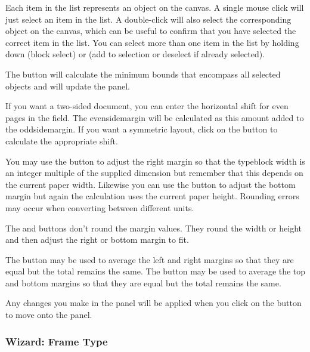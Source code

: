 Each item in the  list represents an \gls{object} on the
\gls{canvas}. A single mouse click will just select an item in the
list. A double-click will also select the corresponding \gls{object}
on the \gls{canvas}, which can be useful to confirm that you have
selected the correct item in the list. You can select more than one
item in the list by holding down  (block select)
or  (add to selection or deselect if already
selected).

The  button will calculate
the minimum bounds that encompass all selected \glspl{object} and
will update the  panel.

If you want a two-sided document, you can enter the horizontal shift
for even pages in the  field.
The \gls{evensidemargin} will be calculated as this
amount added to the \gls{oddsidemargin}.
If you want a symmetric layout, click on the 
button to calculate the appropriate shift.

You may use the  button to adjust the
right margin so that the typeblock width is an integer
multiple of the supplied dimension but remember that this depends on the current
paper width. Likewise you can use the 
button to adjust the bottom margin but again the
calculation uses the current paper height. Rounding errors may occur
when converting between different units.

\begin{important}
The  and 
buttons don't round the margin values. They round the width or
height and then adjust the right or bottom margin to fit.
\end{important}

The  button may be used to average
the left and right margins so that they are equal but the total remains the same.
The  button may be used to average
the top and bottom margins so that they are equal but the total remains the same.

Any changes you make in the  panel will
be applied when you click on the  button to move
onto the  panel.

\subsubsection{Wizard: Frame Type}\label{sec:flfwizardframetype}

